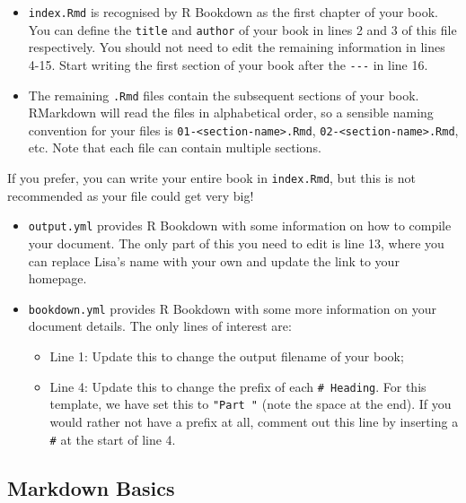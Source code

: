 \documentclass[
]{article}
\providecommand{\tightlist}{%
  \setlength{\itemsep}{0pt}\setlength{\parskip}{0pt}}
\numberwithin{equation}{section}
\numberwithin{figure}{section}
\theoremstyle{break}
\theoremstyle{definition}
\theoremstyle{definition}
\theoremstyle{definition}
\theoremstyle{definition}
\theoremstyle{remark}
\begin{document}
\begin{itemize}
\item
  \texttt{index.Rmd} is recognised by R Bookdown as the first chapter of your book. You can define the \texttt{title} and \texttt{author} of your book in lines 2 and 3 of this file respectively. You should not need to edit the remaining information in lines 4-15. Start writing the first section of your book after the \texttt{-\/-\/-} in line 16.
\item
  The remaining \texttt{.Rmd} files contain the subsequent sections of your book. RMarkdown will read the files in alphabetical order, so a sensible naming convention for your files is \texttt{01-\textless{}section-name\textgreater{}.Rmd}, \texttt{02-\textless{}section-name\textgreater{}.Rmd}, etc. Note that each file can contain multiple sections.
\end{itemize}

If you prefer, you can write your entire book in \texttt{index.Rmd}, but this is not recommended as your file could get very big!

\begin{itemize}
\item
  \texttt{output.yml} provides R Bookdown with some information on how to compile your document. The only part of this you need to edit is line 13, where you can replace Lisa's name with your own and update the link to your homepage.
\item
  \texttt{bookdown.yml} provides R Bookdown with some more information on your document details. The only lines of interest are:

  \begin{itemize}
  \tightlist
  \item
    Line 1: Update this to change the output filename of your book;
  \item
    Line 4: Update this to change the prefix of each \texttt{\#\ Heading}. For this template, we have set this to \texttt{"Part\ "} (note the space at the end). If you would rather not have a prefix at all, comment out this line by inserting a \texttt{\#} at the start of line 4.
  \end{itemize}
\end{itemize}

\hypertarget{markdown-basics}{%
\subsection{Markdown Basics}\label{markdown-basics}}
\end{document}
